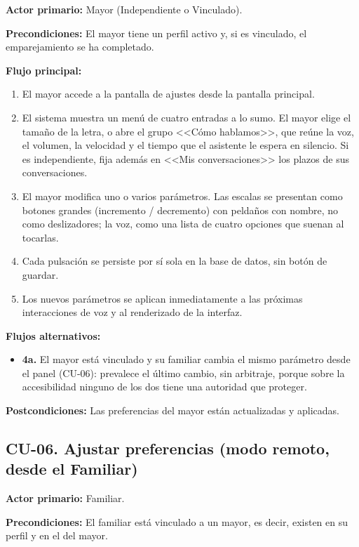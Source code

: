 \noindent\textbf{Actor primario:} Mayor (Independiente o Vinculado).

\noindent\textbf{Precondiciones:} El mayor tiene un perfil activo y, si es vinculado, el emparejamiento se ha completado.

\noindent\textbf{Flujo principal:}
\begin{enumerate}[nosep]
    \item El mayor accede a la pantalla de ajustes desde la pantalla principal.
    \item El sistema muestra un menú de cuatro entradas a lo sumo. El mayor elige el tamaño de la letra, o abre el grupo <<Cómo hablamos>>, que reúne la voz, el volumen, la velocidad y el tiempo que el asistente le espera en silencio. Si es independiente, fija además en <<Mis conversaciones>> los plazos de sus conversaciones.
    \item El mayor modifica uno o varios parámetros. Las escalas se presentan como botones grandes (incremento / decremento) con peldaños con nombre, no como deslizadores; la voz, como una lista de cuatro opciones que suenan al tocarlas.
    \item Cada pulsación se persiste por sí sola en la base de datos, sin botón de guardar.
    \item Los nuevos parámetros se aplican inmediatamente a las próximas interacciones de voz y al renderizado de la interfaz.
\end{enumerate}

\noindent\textbf{Flujos alternativos:}
\begin{itemize}[nosep]
    \item \textbf{4a.} El mayor está vinculado y su familiar cambia el mismo parámetro desde el panel (CU-06): prevalece el último cambio, sin arbitraje, porque sobre la accesibilidad ninguno de los dos tiene una autoridad que proteger.
\end{itemize}

\noindent\textbf{Postcondiciones:} Las preferencias del mayor están actualizadas y aplicadas.

\bigskip

\subsection*{CU-06. Ajustar preferencias (modo remoto, desde el Familiar)}

\noindent\textbf{Actor primario:} Familiar.

\noindent\textbf{Precondiciones:} El familiar está vinculado a un mayor, es decir, existen  en su perfil y  en el del mayor.

